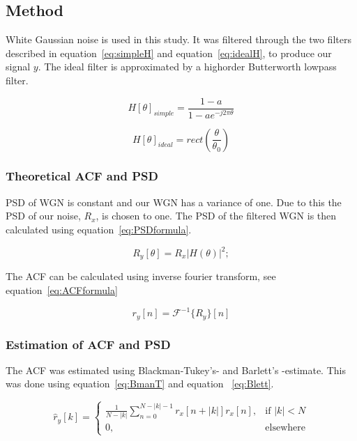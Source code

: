 \documentclass[10pt]{article}
\begin{document}
\subsection{Method}

White Gaussian noise is used in this study. It was filtered through the two
 filters described in equation~\ref{eq:simpleH} and equation~\ref{eq:idealH},
  to produce our signal $y$.
 The ideal filter is approximated by a highorder Butterworth lowpass filter.

\begin{equation}
  \label{eq:simpleH}
  H[\theta]_{simple} =\frac{1-a}{1-ae^{-j2\pi\theta }}
\end{equation}

\begin{equation}
  \label{eq:idealH}
  H[\theta]_{ideal} =rect(\frac{\theta}{\theta_0} )
\end{equation}

\subsubsection{Theoretical ACF and PSD}
PSD of WGN is constant and our WGN has a variance of one. Due to this the PSD
of our noise, $R_x$, is chosen to one.
The PSD of the filtered WGN is then calculated using equation~\ref{eq:PSDformula}.

\begin{equation}
  \label{eq:PSDformula}
  R_y[\theta] = R_x|H(\theta)|^2;
\end{equation}

The ACF can be calculated using inverse fourier transform, see equation~\ref{eq:ACFformula}

\begin{equation}
  \label{eq:ACFformula}
  r_y[n] = \mathcal{F}^{-1}\{R_y\}[n]
\end{equation}



\subsubsection{Estimation of ACF and PSD}
The ACF was estimated using Blackman-Tukey's- and Barlett's -estimate.
This was done using equation~\ref{eq:BmanT} and equation ~\ref{eq:Blett}.

\begin{equation}
\label{eq:BmanT}
\hat{r}_y[k] =
\begin{cases}
    \frac{1}{N-|k|}\sum_{n=0}^{N-|k|-1}r_x[n+|k|]r_x[n],& \text{if } |k|< N\\
    0,              & \text{elsewhere}
\end{cases}
\end{equation}
\end{document}
